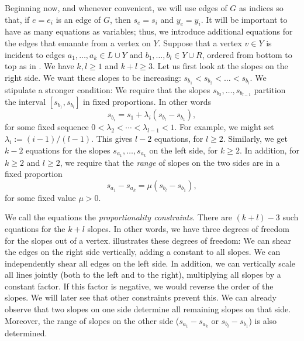 \documentclass{patmorin}
\begin{document}
Beginning now, and whenever convenient, we will use edges of $G$ as indices
so that, if $e=e_i$ is an edge of $G$,
then $s_e=s_i$ and $y_e=y_i$.
It will be important to have as many equations as variables;
thus, we introduce additional equations for the edges that emanate from a
vertex on $Y$.
Suppose that a vertex $v\in Y$ is incident to edges $a_1,\ldots,a_k\in L\cup Y$ 
and $b_1,\ldots,b_l\in Y\cup R$, ordered from bottom to top as in .
We have $k,l\ge1$ and $k+l\ge 3$.
Let us first look at the slopes on the right side.
We want these slopes to be increasing:
$s_{b_1} < s_{b_2} < \dots  <s_{b_l}$. We stipulate a stronger
condition:
We require that the slopes
$s_{b_2}, \dots, s_{b_{l-1}}$ partition the interval
$[s_{b_1},s_{b_l}]$ in fixed proportions. In other words
\begin{equation}
  \label{eq:proportion}
s_{b_i} = s_1 + \lambda_i(s_{b_{l}}-s_{b_1}),
\end{equation}
for some fixed sequence $0<\lambda_2<\cdots<\lambda_{l-1}<1$.
For example, we might set $\lambda_i := (i-1)/(l-1)$.
This gives $l-2$ equations, for $l\ge 2$. Similarly, we get
$k-2$ equations for the slopes
$s_{a_1}, \dots, s_{a_{k}}$ on the left side, for $k\ge 2$.
In addition, for $k\ge 2$ and $l\ge 2$, we require that the \emph{range} of
slopes
on the two sides are in a fixed proportion
\begin{equation}
  \label{eq:proportion2}
s_{a_1}-s_{a_{k}} = \mu (s_{b_{l}}-s_{b_1}),
\end{equation}
for some fixed value $\mu>0$.

We call the equations
\thetag{\ref{eq:proportion}--\ref{eq:proportion2}} the
\emph{proportionality constraints}.
There are $(k+l)-3$ such equations for the $k+l$ slopes. In
other words, we have three degrees of freedom for the slopes out of a vertex.
 illustrates these  degrees of freedom:
We can shear the edges on the right side vertically, adding a constant to all
slopes.
 We can independently shear all edges on the left side.
In addition, we can vertically scale {all} lines jointly (both to
the left and to the right), multiplying all slopes by a constant factor.
If this factor is negative, we would reverse the order of the
slopes. We will later see that other constraints prevent this.
We can already observe that two slopes on one side determine all
remaining slopes on that side. Moreover, the range of slopes
on the other side
($s_{a_1}-s_{a_{k}}$ or $s_{b_{l}}-s_{b_1}$) is also determined.
\end{document}
